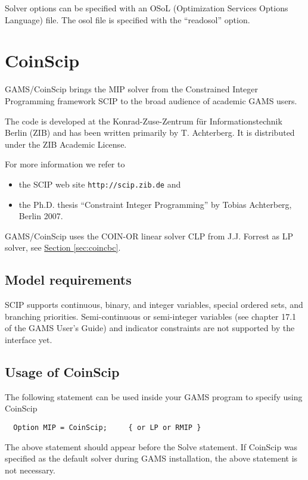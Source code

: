 Solver options can be specified with an OSoL (Optimization Services Options Language) file.
The osol file is specified with the ``readosol'' option.



\section{CoinScip}

GAMS/CoinScip brings the MIP solver from the Constrained Integer Programming framework SCIP to the broad audience of academic GAMS users.

The code is developed at the Konrad-Zuse-Zentrum f\"ur Informationstechnik Berlin (ZIB) and has been written primarily by T. Achterberg.
It is distributed under the ZIB Academic License.

For more information we refer to
\begin{itemize}
\item the SCIP web site \texttt{http://scip.zib.de} and
\item the Ph.D. thesis ``Constraint Integer Programming'' by Tobias Achterberg, Berlin 2007.
\end{itemize}

GAMS/CoinScip uses the COIN-OR linear solver CLP from J.J. Forrest as LP solver, see \hyperlink{sec:coincbc}{Section \ref{sec:coincbc}}.

\subsection{Model requirements}

SCIP supports continuous, binary, and integer variables, special ordered sets, and branching priorities.
Semi-continuous or semi-integer variables (see chapter 17.1 of the GAMS User's Guide) and indicator constraints are not supported by the interface yet.

\subsection{Usage of CoinScip}

The following statement can be used inside your GAMS program to specify using CoinScip
\begin{verbatim}
  Option MIP = CoinScip;     { or LP or RMIP }
\end{verbatim}

The above statement should appear before the Solve statement.
If CoinScip was specified as the default solver during GAMS installation, the above statement is not necessary.

